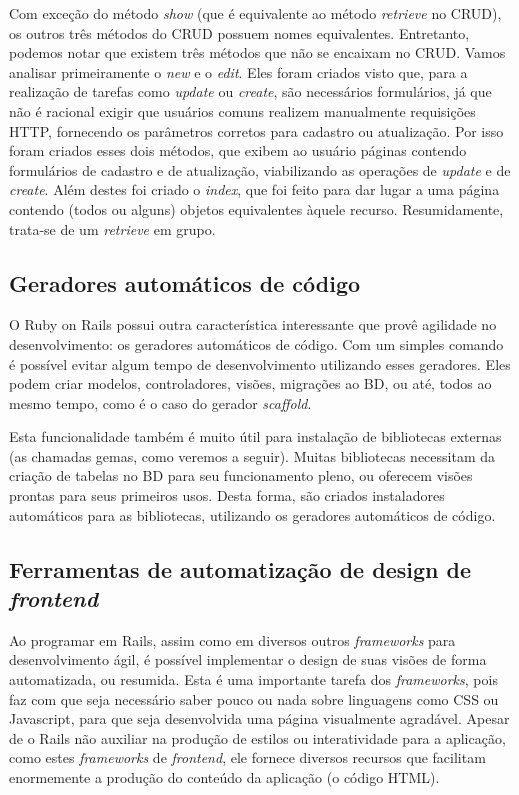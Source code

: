 Com exceção do método \textit{show} (que é equivalente ao método \textit{retrieve} no CRUD), os outros três métodos do CRUD possuem nomes equivalentes. Entretanto, podemos notar que existem três métodos que não se encaixam no CRUD. Vamos analisar primeiramente o \textit{new} e o \textit{edit}. Eles foram criados visto que, para a realização de tarefas como \textit{update} ou \textit{create}, são necessários formulários, já que não é racional exigir que usuários comuns realizem manualmente requisições HTTP, fornecendo os parâmetros corretos para cadastro ou atualização. Por isso foram criados esses dois métodos, que exibem ao usuário páginas contendo formulários de cadastro e de atualização, viabilizando as operações de \textit{update} e de \textit{create}. Além destes foi criado o \textit{index}, que foi feito para dar lugar a uma página contendo (todos ou alguns) objetos equivalentes àquele recurso. Resumidamente, trata-se de um \textit{retrieve} em grupo.

\subsection{Geradores automáticos de código}

O Ruby on Rails possui outra característica interessante que provê agilidade no desenvolvimento: os geradores automáticos de código. Com um simples comando é possível evitar algum tempo de desenvolvimento utilizando esses geradores. Eles podem criar modelos, controladores, visões, migrações ao BD, ou até, todos ao mesmo tempo, como é o caso do gerador \textit{scaffold}.

Esta funcionalidade também é muito útil para instalação de bibliotecas externas (as chamadas gemas, como veremos a seguir). Muitas bibliotecas necessitam da criação de tabelas no BD para seu funcionamento pleno, ou oferecem visões prontas para seus primeiros usos. Desta forma, são criados instaladores automáticos para as bibliotecas, utilizando os geradores automáticos de código.

\subsection{Ferramentas de automatização de design de \textit{frontend}}

Ao programar em Rails, assim como em diversos outros \textit{frameworks} para desenvolvimento ágil, é possível implementar o design de suas visões de forma automatizada, ou resumida. Esta é uma importante tarefa dos \textit{frameworks}, pois faz com que seja necessário saber pouco ou nada sobre linguagens como CSS ou Javascript, para que seja desenvolvida uma página visualmente agradável. Apesar de o Rails não auxiliar na produção de estilos ou interatividade para a aplicação, como estes \textit{frameworks} de \textit{frontend}, ele fornece diversos recursos que facilitam enormemente a produção do conteúdo da aplicação (o código HTML).

